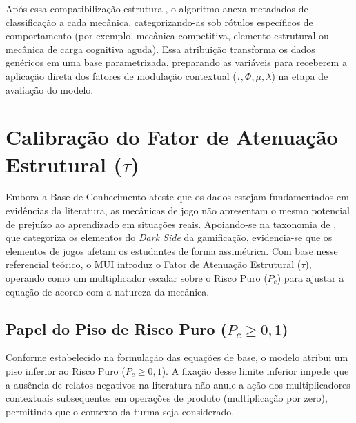 
Após essa compatibilização estrutural, o algoritmo anexa metadados de classificação a cada mecânica, categorizando-as sob rótulos específicos de comportamento (por exemplo, mecânica competitiva, elemento estrutural ou mecânica de carga cognitiva aguda). Essa atribuição transforma os dados genéricos em uma base parametrizada, preparando as variáveis para receberem a aplicação direta dos fatores de modulação contextual ($\tau, \Phi, \mu, \lambda$) na etapa de avaliação do modelo.


\section{Calibração do Fator de Atenuação Estrutural ($\tau$)}

Embora a Base de Conhecimento ateste que os dados estejam fundamentados em evidências da literatura, as mecânicas de jogo não apresentam o mesmo potencial de prejuízo ao aprendizado em situações reais. Apoiando-se na taxonomia de , que categoriza os elementos do \textit{Dark Side} da gamificação, evidencia-se que os elementos de jogos afetam os estudantes de forma assimétrica. Com base nesse referencial teórico, o MUI introduz o Fator de Atenuação Estrutural ($\tau$), operando como um multiplicador escalar sobre o Risco Puro ($P_c$) para ajustar a equação de acordo com a natureza da mecânica.


\subsection{Papel do Piso de Risco Puro ($P_c \ge 0,1$)}

Conforme estabelecido na formulação das equações de base, o modelo atribui um piso inferior ao Risco Puro ($P_c \ge 0,1$). A fixação desse limite inferior impede que a ausência de relatos negativos na literatura não anule a ação dos multiplicadores contextuais subsequentes em operações de produto (multiplicação por zero), permitindo que o contexto da turma seja considerado.

